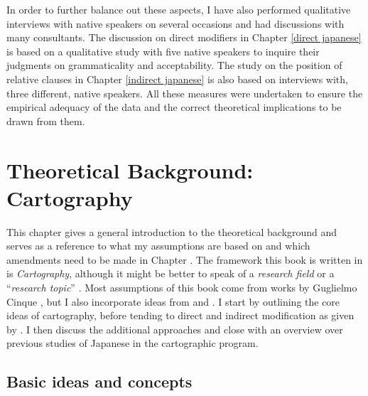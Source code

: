 \documentclass [output=book,colorlinks,citecolor=brown]{langscibook}
\begin{document}
In order to further balance out these aspects, I have also performed qualitative interviews with native speakers on several occasions and had discussions with many consultants. The discussion on direct modifiers in Chapter \ref{direct japanese} is based on a qualitative study with five native speakers to inquire their judgments on grammaticality and acceptability. The study on the position of relative clauses in Chapter \ref{indirect japanese} is also based on interviews with, three different, native speakers. All these measures were undertaken to ensure the empirical adequacy of the data and the correct theoretical implications to be drawn from them.

\chapter{Theoretical Background: Cartography} \label{theoretical background}

This chapter gives a general introduction to the theoretical background and serves as a reference to what my assumptions are based on and which amendments need to be made in Chapter . The framework this book is written in is \textit{Cartography}, although it might be better to speak of a \textit{research field} or a ``\textit{research topic}'' \citep[65]{cinriz:2010:carto}. Most assumptions of this book come from works by Guglielmo Cinque \citep{cinque:1993:evidence, cinque:2010:adj, cinque:2017:micro, cinque:2020:relcl, cinque:2021:carto, cinque:2023:linearization}, but I also incorporate ideas from \citet{laenzlinger:2005:french, laenzlinger:2011:elements, laenzlinger:2015:the, svenonius:2008:position} and \citet{kim:2019:syntax}. I start by outlining the core ideas of cartography, before tending to direct and indirect modification as given by \citet{cinque:2010:adj}. I then discuss the additional approaches and close with an overview over previous studies of Japanese in the cartographic program.

\section{Basic ideas and concepts} \label{sectioncarto}
\end{document}
